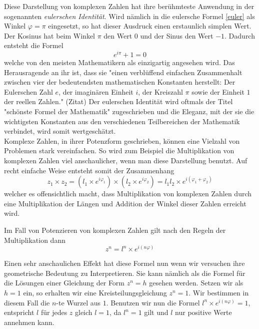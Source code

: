 \documentclass[a4paper,12pt]{article} %
\begin{document}

Diese Darstellung von komplexen Zahlen hat ihre berühmteste Anwendung in der sogenannten \emph{eulerschen Identität}.
Wird nämlich in die eulersche Formel \eqref{euler} als Winkel $\varphi=\pi$ eingesetzt, so hat dieser Ausdruck einen erstaunlich simplen Wert.
Der Kosinus hat beim Winkel $\pi$ den Wert $0$ und der Sinus den Wert $-1$.
Dadurch entsteht die Formel
\[e^{i\pi}+1=0\]
welche von den meisten Mathematikern als einzigartig angesehen wird.
Das Herausragende an ihr ist, dass sie "{}einen verblüffend einfachen Zusammenhalt zwischen vier der bedeutendsten mathematischen Konstanten herstellt:
Der Eulerschen Zahl $e$, der imaginären Einheit $i$, der Kreiszahl $\pi$ sowie der Einheit $1$ der reellen Zahlen." (Zitat)
Der eulerschen Identität wird oftmals der Titel "{}schönste Formel der Mathematik" zugeschrieben und die Eleganz, mit der sie die wichtigsten Konstanten aus den verschiedenen Teilbereichen der Mathematik verbindet, wird somit wertgeschätzt.\\




Komplexe Zahlen, in ihrer Potenzform geschrieben, können eine Vielzahl von Problemen stark vereinfachen.
So wird zum Beispiel die Multiplikation von komplexen Zahlen viel anschaulicher, wenn man diese Darstellung benutzt.
Auf recht einfache Weise entsteht somit der Zusammenhang
\[z_1\times z_2=(l_1 \times e^{i\varphi_1}) \times (l_2 \times e^{i\varphi_2})=l_1 l_2 \times e^{i(\varphi_1+\varphi_2)}\]
welcher es offensichtlich macht, dass Multiplikation von komplexen Zahlen durch eine Multiplikation der Längen und Addition der Winkel dieser Zahlen erreicht wird.

Im Fall von Potenzieren von komplexen Zahlen gilt nach den Regeln der Multiplikation dann
\[z^n=l^n \times e^{i(n\varphi)}\]

Einen sehr anschaulichen Effekt hat diese Formel nun wenn wir versuchen ihre geometrische Bedeutung zu Interpretieren.
Sie kann nämlich als die Formel für die Lösungen einer Gleichung der Form $z^n=h$ gesehen werden.
Setzen wir als $h=1$ ein, so erhalten wir eine Kreisteilungsgleichung $z^n=1$. Wir bestimmen in diesem Fall die $n$-te Wurzel aus $1$.
Benutzen wir nun die Formel $l^n \times e^{i(n\varphi)}=1$, entspricht $l$ für jedes $z$ gleich $l=1$, da $l^n=1$ gilt und $l$ nur positive Werte annehmen kann.
\end{document}
